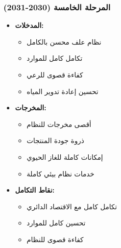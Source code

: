 \subsubsection{المرحلة الخامسة (2030-2031)}
\begin{itemize}
    \item \textbf{المدخلات:}
    \begin{itemize}
        \item نظام علف محسن بالكامل
        \item تكامل كامل للموارد
        \item كفاءة قصوى للرعي
        \item تحسين إعادة تدوير المياه
    \end{itemize}
    \item \textbf{المخرجات:}
    \begin{itemize}
        \item أقصى مخرجات للنظام
        \item ذروة جودة المنتجات
        \item إمكانات كاملة للغاز الحيوي
        \item خدمات نظام بيئي كاملة
    \end{itemize}
    \item \textbf{نقاط التكامل:}
    \begin{itemize}
        \item تكامل كامل مع الاقتصاد الدائري
        \item تحسين كامل للموارد
        \item كفاءة قصوى للنظام
    \end{itemize}
\end{itemize}
